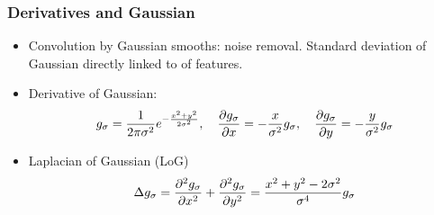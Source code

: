 \documentclass[10pt]{beamer}
\newcommand{\myemph}[1]{{\color{blue}{#1}}}
\begin{document}
\begin{frame}
  \frametitle{Derivatives and Gaussian}
  \begin{itemize} 
  \item Convolution by Gaussian smooths: noise removal. Standard
    deviation of Gaussian directly linked to \myemph{scale} of
    features.
  \item Derivative of Gaussian:
    $$
    g_\sigma = \frac{1}{2\pi\sigma^2}e^{-\frac{x^2 + y^2}{2\sigma^2}},\quad \frac{\partial{g_\sigma}}{\partial{x}} = -\frac{x}{\sigma^2}g_\sigma,\quad
    \frac{\partial{g_\sigma}}{\partial{y}} = -\frac{y}{\sigma^2}g_\sigma
    $$
  \item Laplacian of Gaussian (LoG)
    $$
    \Delta g_\sigma = \frac{\partial^{2}{g_\sigma}}{\partial{x^2}} +  \frac{\partial^{2}{g_\sigma}}{\partial{y^2}} = \frac{x^2 + y^2 - 2\sigma^2}{\sigma^4}g_\sigma
    $$
  \end{itemize}
\end{frame}



\end{document}
